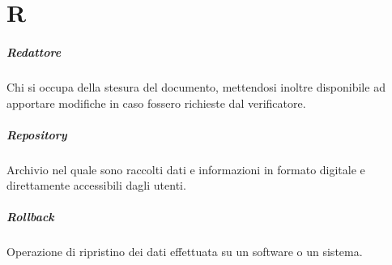 \chapter{R}

\paragraph*{Redattore}
Chi si occupa della stesura del documento, mettendosi inoltre disponibile ad apportare modifiche in caso fossero richieste dal verificatore.

\paragraph*{Repository}
Archivio nel quale sono raccolti dati e informazioni in formato digitale e direttamente accessibili dagli utenti.

\paragraph*{Rollback}
Operazione di ripristino dei dati effettuata su un software o un sistema.
